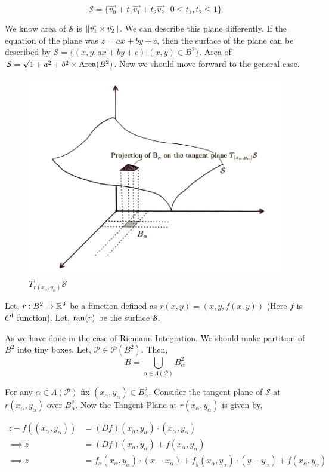 \documentclass[../Analysis-3]{subfiles}
\begin{document}
$$ \mathcal{S} = \{ \vec{v_0} + t_1 \vec{v_1} +t_2 \vec{v_2} \ | \ 0 \le t_1,t_2 \le 1\} $$

We know area of $\mathcal{S}$ is $\norm{\vec{v_1}\times \vec{v_2}}$. We can describe this plane differently. If the equation of the plane was $z=ax+by+c$, then the surface of the plane can be described by $\mathcal{S} = \{(x, y, ax+by+c) | (x,y) \in B^2 \}$. Area of $\mathcal{S} = \sqrt{1+a^2+b^2} \times \operatorname{Area}(B^2)$. Now we should move forward to the general case.

\begin{figure}
    \centering
    \includegraphics[width=.78\linewidth]{../figures/lec-25.2.png}
    \caption{$T_{r(x_{\alpha},y_{\alpha})} \mathcal{S}$}
\end{figure}


Let, $r : B^2 \to \mathbb{R}^3$ be a function defined as $r(x,y) = (x,y,f(x,y))$ (Here $f$ is $C^1$ function). Let, $\operatorname{ran}(r)$ be the surface $\mathcal{S}$.

\vspace{0.2cm}

As we have done in the case of Riemann Integration. We should make partition of $B^2$ into tiny boxes.  Let, $\mathcal{P} \in \mathscr{P}(B^2)$. Then,
\[B = \bigcup_{\alpha \in \Lambda(\mathcal{P})} B_{\alpha}^2\]

For any $\alpha \in \Lambda(\mathcal{P})$ fix $(x_{\alpha},y_{\alpha}) \in B_{\alpha}^2$. Consider the tangent plane of $\mathcal{S}$ at $r(x_{\alpha},y_{\alpha})$ over $B_{\alpha}^2$. Now the Tangent Plane at $r(x_{\alpha},y_{\alpha})$ is given by,

\begin{align*}
    z - f((x_{\alpha},y_{\alpha})) & = (Df)(x_{\alpha},y_{\alpha}) \cdot (x_{\alpha},y_{\alpha})                                                                       \\
    \implies z                     & = (Df)(x_{\alpha},y_{\alpha}) + f(x_{\alpha},y_{\alpha})                                                                          \\
    \implies z                     & = f_x(x_{\alpha},y_{\alpha}) \cdot (x - x_{\alpha}) +f_y(x_{\alpha},y_{\alpha}) \cdot (y - y_{\alpha}) + f(x_{\alpha},y_{\alpha}) \\
\end{align*}
\end{document}
